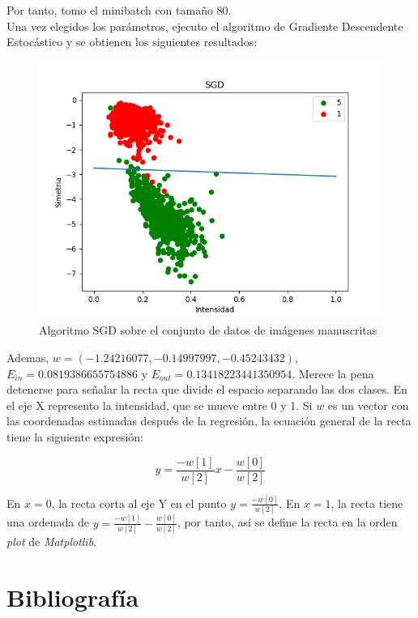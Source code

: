Por tanto, tomo el minibatch con tamaño 80.\\

Una vez elegidos los parámetros, ejecuto el algoritmo de Gradiente Descendente Estocástico y se obtienen los siguientes resultados:

\begin{figure}[H] %
	\centering
	\includegraphics[scale=0.6]{sgd.png}  %
	\caption{Algoritmo SGD sobre el conjunto de datos de imágenes manuscritas} 
	\label{fig:sgd}
\end{figure}

Ademas, $w=(-1.24216077,-0.14997997,-0.45243432)$, $E_{in} = 0.0819386655754886$ y $E_{out} = 0.13418223441350954$.
Merece la pena detenerse para señalar la recta que divide el espacio separando las dos clases. En el eje X represento la intensidad, que se mueve entre 0 y 1. Si $w$ es un vector con las coordenadas estimadas después de la regresión, la ecuación general de la recta tiene la siguiente expresión:

$$y = \frac{-w[1]}{w[2]}x - \frac{w[0]}{w[2]}$$

En $x=0$, la recta corta al eje Y en el punto $y = \frac{-w[0]}{w[2]}$. En $x=1$, la recta tiene una ordenada de $y=\frac{-w[1]}{w[2]}- \frac{w[0]}{w[2]}$, por tanto, así se define la recta en la orden \textit{plot} de \textit{Matplotlib}.
\newpage
\section{Bibliografía}




